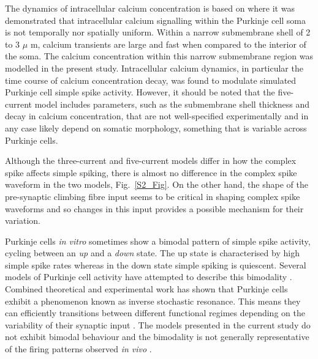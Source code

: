 \documentclass[twocolumn]{svjour3}          %
\begin{document}
The dynamics of intracellular calcium concentration is based on
\citet{EilersEtAl1995} where it was demonstrated that intracellular
calcium signalling within the Purkinje cell soma is not temporally nor
spatially uniform. Within a narrow submembrane shell of 2 to 3 $\mu$
m, calcium transients are large and fast when compared to the interior
of the soma. The calcium concentration within this narrow submembrane
region was modelled in the present study. Intracellular calcium
dynamics, in particular the time course of calcium concentration
decay, was found to modulate simulated Purkinje cell simple spike
activity. However, it should be noted that the five-current model
includes parameters, such as the submembrane shell thickness and decay
in calcium concentration, that are not well-specified experimentally
and in any case likely depend on somatic morphology, something that is
variable across Purkinje cells.

Although the three-current and five-current models differ in how the
complex spike affects simple spiking, there is almost no difference in
the complex spike waveform in the two models, Fig.~\ref{S2_Fig}. On
the other hand, the shape of the pre-synaptic climbing fibre input
seems to be critical in shaping complex spike waveforms and so changes
in this input provides a possible mechanism for their variation.

Purkinje cells \textsl{in vitro} sometimes show a bimodal pattern of
simple spike activity, cycling between an \textsl{up} and a
\textsl{down} state. The up state is characterised by high simple
spike rates whereas in the down state simple spiking is
quiescent. Several models of Purkinje cell activity have attempted to
describe this bimodality
\citep{Forrest2014,ForrestEtAl2012,LlinasSugimori1980b,LoewensteinEtAl2005,McKayEtAl2007,WilliamsEtAl2002}. Combined theoretical and experimental work has shown that Purkinje cells exhibit a phenomenon known as inverse stochastic resonance. This means they can efficiently transitions between different functional regimes depending on the variability of their synaptic input \citep{buchin2016inverse}. The
models presented in the current study do not exhibit bimodal behaviour and the
bimodality is not generally representative of the firing patterns
observed \textsl{in vivo}
\citep{CerminaraRawson2004,McKayEtAl2007,SchonewilleEtAl2006}.
\end{document}
